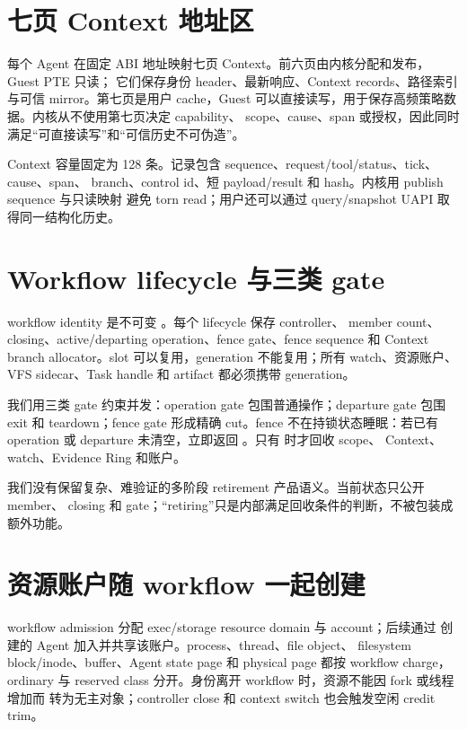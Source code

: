 \section{七页 Context 地址区}

每个 Agent 在固定 ABI 地址映射七页 Context。前六页由内核分配和发布，Guest PTE 只读；
它们保存身份 header、最新响应、Context records、路径索引与可信 mirror。第七页是用户
cache，Guest 可以直接读写，用于保存高频策略数据。内核从不使用第七页决定 capability、
scope、cause、span 或授权，因此同时满足“可直接读写”和“可信历史不可伪造”。

Context 容量固定为 128 条。记录包含 sequence、request/tool/status、tick、cause、span、
branch、control id、短 payload/result 和 hash。内核用 publish sequence 与只读映射
避免 torn read；用户还可以通过 query/snapshot UAPI 取得同一结构化历史。

\section{Workflow lifecycle 与三类 gate}

workflow identity 是不可变 。每个 lifecycle 保存 controller、
member count、closing、active/departing operation、fence gate、fence sequence 和 Context
branch allocator。slot 可以复用，generation 不能复用；所有 watch、资源账户、VFS
sidecar、Task handle 和 artifact 都必须携带 generation。

我们用三类 gate 约束并发：operation gate 包围普通操作；departure gate 包围 exit 和
teardown；fence gate 形成精确 cut。fence 不在持锁状态睡眠：若已有 operation 或
departure 未清空，立即返回 。只有
 时才回收 scope、
Context、watch、Evidence Ring 和账户。

\begin{designbox}[更小的生命周期状态机]
我们没有保留复杂、难验证的多阶段 retirement 产品语义。当前状态只公开 member、
closing 和 gate；“retiring”只是内部满足回收条件的判断，不被包装成额外功能。
\end{designbox}

\section{资源账户随 workflow 一起创建}

workflow admission 分配 exec/storage resource domain 与 account；后续通过
 创建的 Agent 加入并共享该账户。process、thread、file object、
filesystem block/inode、buffer、Agent state page 和 physical page 都按 workflow charge，
ordinary 与 reserved class 分开。身份离开 workflow 时，资源不能因 fork 或线程增加而
转为无主对象；controller close 和 context switch 也会触发空闲 credit trim。

